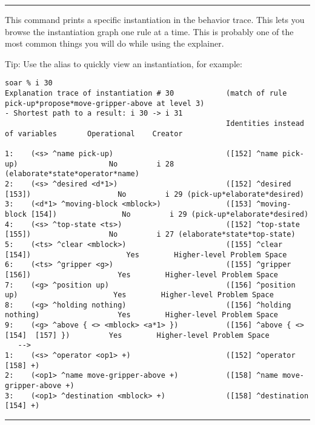 \rule{\textwidth}{1pt}

\textbf{}

This command prints a specific instantiation in the behavior trace.  This lets you browse the instantiation graph one rule at a time. This is probably one of the most common things you will do while using the explainer.

Tip: Use the alias  to quickly view an instantiation, for example:

{\tiny
\begin{verbatim}
soar % i 30
Explanation trace of instantiation # 30            (match of rule pick-up*propose*move-gripper-above at level 3)
- Shortest path to a result: i 30 -> i 31
                                                   Identities instead of variables       Operational    Creator

1:    (<s> ^name pick-up)                          ([152] ^name pick-up)                     No         i 28 (elaborate*state*operator*name)
2:    (<s> ^desired <d*1>)                         ([152] ^desired [153])                    No         i 29 (pick-up*elaborate*desired)
3:    (<d*1> ^moving-block <mblock>)               ([153] ^moving-block [154])               No         i 29 (pick-up*elaborate*desired)
4:    (<s> ^top-state <ts>)                        ([152] ^top-state [155])                  No         i 27 (elaborate*state*top-state)
5:    (<ts> ^clear <mblock>)                       ([155] ^clear [154])                      Yes        Higher-level Problem Space
6:    (<ts> ^gripper <g>)                          ([155] ^gripper [156])                    Yes        Higher-level Problem Space
7:    (<g> ^position up)                           ([156] ^position up)                      Yes        Higher-level Problem Space
8:    (<g> ^holding nothing)                       ([156] ^holding nothing)                  Yes        Higher-level Problem Space
9:    (<g> ^above { <> <mblock> <a*1> })           ([156] ^above { <>[154]  [157] })         Yes        Higher-level Problem Space
   -->
1:    (<s> ^operator <op1> +)                      ([152] ^operator [158] +)
2:    (<op1> ^name move-gripper-above +)           ([158] ^name move-gripper-above +)
3:    (<op1> ^destination <mblock> +)              ([158] ^destination [154] +)
\end{verbatim}
}

\rule{\textwidth}{1pt}

\textbf{}

